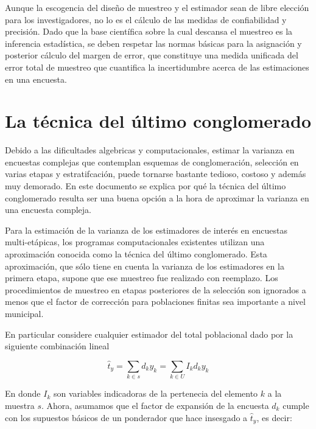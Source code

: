 \documentclass[
  12pt,
  spanish,
]{book}
\begin{document}
Aunque la escogencia del diseño de muestreo y el estimador sean de libre elección para los investigadores, no lo es el cálculo de las medidas de confiabilidad y precisión. Dado que la base científica sobre la cual descansa el muestreo es la inferencia estadística, se deben respetar las normas básicas para la asignación y posterior cálculo del margen de error, que constituye una medida unificada del error total de muestreo que cuantifica la incertidumbre acerca de las estimaciones en una encuesta.

\hypertarget{la-tuxe9cnica-del-uxfaltimo-conglomerado}{%
\section{La técnica del último conglomerado}\label{la-tuxe9cnica-del-uxfaltimo-conglomerado}}

Debido a las dificultades algebricas y computacionales, estimar la varianza en encuestas complejas que contemplan esquemas de conglomeración, selección en varias etapas y estratifcación, puede tornarse bastante tedioso, costoso y además muy demorado. En este documento se explica por qué la técnica del último conglomerado resulta ser una buena opción a la hora de aproximar la varianza en una encuesta compleja.

Para la estimación de la varianza de los estimadores de interés en encuestas multi-etápicas, los programas computacionales existentes utilizan una aproximación conocida como la técnica del último conglomerado. Esta aproximación, que sólo tiene en cuenta la varianza de los estimadores en la primera etapa, supone que ese muestreo fue realizado con reemplazo. Los procedimientos de muestreo en etapas posteriores de la selección son ignorados a menos que el factor de corrección para poblaciones finitas sea importante a nivel municipal.

En particular considere cualquier estimador del total poblacional dado por la siguiente combinación lineal

\begin{equation}
\label{est}
\hat{t}_{y}=\sum_{k\in s} d_k y_k = \sum_{k\in U} I_k d_k y_k 
\end{equation}

En donde \(I_k\) son variables indicadoras de la pertenecia del elemento \(k\) a la muestra \(s\). Ahora, asumamos que el factor de expansión de la encuesta \(d_k\) cumple con los supuestos básicos de un ponderador que hace insesgado a \(\hat{t}_{y}\), es decir:
\end{document}
